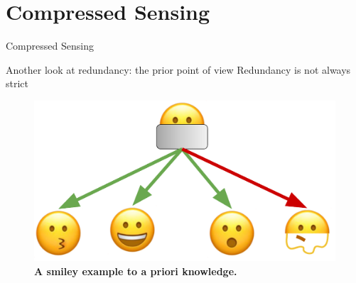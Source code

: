 \section{Compressed Sensing}

\begin{frame}[plain,c]
    
    \begin{center}
        \color{DarkBlue}
    \Huge Compressed Sensing
    \end{center}
    
\end{frame}

\begin{frame}{Another look at redundancy: the prior point of view}
    Redundancy is not always strict
    \begin{figure}
        \centering
        \includegraphics[height=0.5\textheight]{Figures/cs_figures/smiley_prior.pdf}
        \caption{\label{fig:redundancy-smiley}\textbf{A smiley example to a priori knowledge.} 
        }
    \end{figure}
\end{frame}

